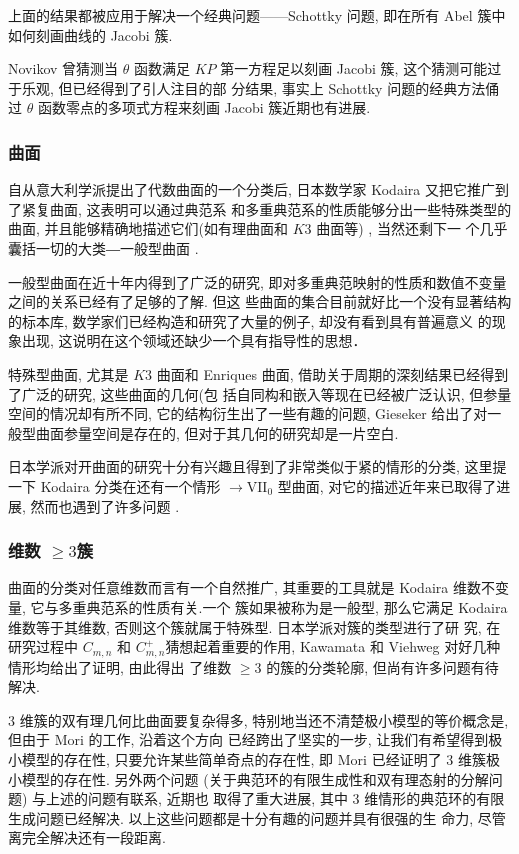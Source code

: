 \documentclass[UTF8,AutoFakeBold,scheme=chinese,eversion]{GXMU-Thesis}
\begin{document}
上面的结果都被应用于解决一个经典问题——Schottky 问题, 即在所有 Abel 簇中如何刻画曲线的 Jacobi 簇.

Novikov 曾猜测当 $\theta$ 函数满足 $K P$ 第一方程足以刻画 Jacobi 簇, 这个猜测可能过于乐观, 但已经得到了引人注目的部 分结果, 事实上 Schottky 问题的经典方法俑过 $\theta$ 函数零点的多项式方程来刻画 Jacobi 簇近期也有进展.
\subsubsection{曲面}
自从意大利学派提出了代数曲面的一个分类后, 日本数学家 Kodaira 又把它推广到了紧复曲面, 这表明可以通过典范系 和多重典范系的性质能够分出一些特殊类型的曲面, 并且能够精确地描述它们(如有理曲面和 $K 3$ 曲面等) , 当然还剩下一 个几乎囊括一切的大类―一般型曲面 .

一般型曲面在近十年内得到了广泛的研究, 即对多重典范映射的性质和数值不变量之间的关系已经有了足够的了解. 但这 些曲面的集合目前就好比一个没有显著结构的标本库, 数学家们已经构造和研究了大量的例子, 却没有看到具有普遍意义 的现象出现, 这说明在这个领域还缺少一个具有指导性的思想．

特殊型曲面, 尤其是 $K 3$ 曲面和 Enriques 曲面, 借助关于周期的深刻结果已经得到了广泛的研究, 这些曲面的几何(包 括自同构和嵌入等现在已经被广泛认识, 但参量空间的情况却有所不同, 它的结构衍生出了一些有趣的问题, Gieseker 给出了对一般型曲面参量空间是存在的, 但对于其几何的研究却是一片空白.

日本学派对开曲面的研究十分有兴趣且得到了非常类似于紧的情形的分类, 这里提一下 Kodaira 分类在还有一个情形 $\longrightarrow \mathrm{VII}_0$ 型曲面, 对它的描述近年来已取得了进展, 然而也遇到了许多问题 .
\subsubsection{维数 \texorpdfstring{$\geq 3$}  的簇}

曲面的分类对任意维数而言有一个自然推广, 其重要的工具就是 Kodaira 维数不变量, 它与多重典范系的性质有关.一个 簇如果被称为是一般型, 那么它满足 Kodaira 维数等于其维数, 否则这个簇就属于特殊型. 日本学派对簇的类型进行了研 究, 在研究过程中 $C_{m, n}$ 和 $C_{m, n}^{+}$猜想起着重要的作用, Kawamata 和 Viehweg 对好几种情形均给出了证明, 由此得出 了维数 $\geq 3$ 的簇的分类轮廓, 但尚有许多问题有待解决.

$3$ 维簇的双有理几何比曲面要复杂得多, 特别地当还不清楚极小模型的等价概念是, 但由于 Mori 的工作, 沿着这个方向 已经跨出了坚实的一步, 让我们有希望得到极小模型的存在性, 只要允许某些简单奇点的存在性, 即 Mori 已经证明了 3 维簇极小模型的存在性. 另外两个问题 (关于典范环的有限生成性和双有理态射的分解问题) 与上述的问题有联系, 近期也 取得了重大进展, 其中 3 维情形的典范环的有限生成问题已经解决. 以上这些问题都是十分有趣的问题并具有很强的生 命力, 尽管离完全解决还有一段距离.
\end{document}
